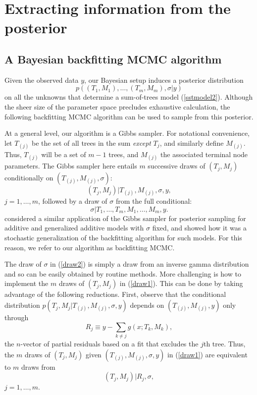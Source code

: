 \documentclass[aoas,nameyear,dvips]{arximspdf}
\newcommand{\citeasnoun}[1]{\citet{#1}}
\begin{document}
\section{Extracting information from the posterior}\label{sec:postcalc}

\subsection{A Bayesian backfitting MCMC algorithm} \label{sec:mcmc}

Given the observed data $y$, our Bayesian setup induces a
posterior distribution
\begin{equation} \label{posterior}
p((T_1,M_1), \ldots,(T_m,M_m),\sigma |  y)
\end{equation}
on all the unknowns that determine a sum-of-trees model
(\ref{sstmodel2}).  Although the sheer size of the parameter
space precludes exhaustive calculation,  the following backfitting
MCMC algorithm can be used to sample from this posterior.

At a general level, our algorithm is a Gibbs sampler.  For
notational convenience, let $T_{(j)}$ be the set of all trees in
the sum \textit{except} $T_j$, and similarly define $M_{(j)}$. Thus,
$T_{(j)}$ will be a set of $m-1$ trees, and $M_{(j)}$ the
associated terminal node parameters.  The Gibbs sampler here
entails $m$ successive draws of $(T_j,M_j)$ conditionally on
$(T_{(j)}, M_{(j)}, \sigma)$:
\begin{equation}\label{draw1}
(T_j,M_j) | T_{(j)}, M_{(j)}, \sigma, y,
\end{equation}
$j = 1,\ldots,m$, followed by a draw of $\sigma$ from the full conditional:
\begin{equation}\label{draw2}
\sigma | T_1,  \ldots, T_m, M_1, \ldots, M_m, y  .
\end{equation}
\citeasnoun{HastTibs2000} considered a similar application of
the Gibbs sampler for posterior sampling for additive and
generalized additive models with $\sigma$ fixed, and showed how it
was a stochastic generalization of the backfitting algorithm for
such models.  For this reason, we refer to our algorithm as
backfitting MCMC.

The draw of $\sigma$ in (\ref{draw2}) is simply a draw from an
inverse gamma distribution and so can be easily obtained by
routine methods.  More challenging is how to implement the
$m$ draws of $(T_j,M_j)$ in (\ref{draw1}). This can be done by
taking advantage of the following reductions. First, observe that
the conditional distribution $p(T_j,M_j |   T_{(j)}, M_{(j)},
\sigma , y)$ depends on $(T_{(j)}, M_{(j)}, y)$ only through
\begin{equation}
R_j \equiv y - \sum_{k \neq j} g(x;T_k,M_k),
\end{equation}
the $n$-vector of partial residuals based on a fit that excludes
the $j$th tree. Thus, the $m$ draws of $(T_j,M_j)$ given $(T_{(j)},
M_{(j)}, \sigma , y)$ in (\ref{draw1}) are equivalent to $m$ draws
from
\begin{equation} \label{newdraw}
(T_j,M_j) | R_j, \sigma,
\end{equation}
$j = 1,\ldots,m$.
\end{document}
